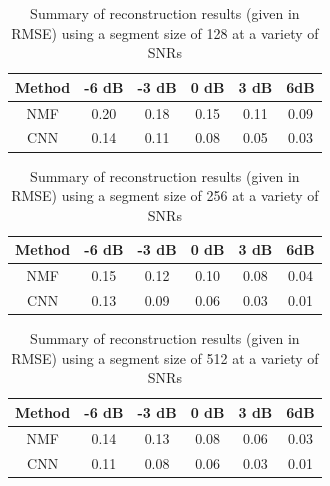 \documentclass[12pt,chapterheads]{ucsd}
\begin{document}
\vspace{0.25in}
\begin{table}[!ht]
\caption{Summary of reconstruction results (given in RMSE) using a segment size of 128 at a variety of SNRs}

\vspace{-0.25in}
\begin{center}
\begin{tabular}{| c | c | c |  c | c | c |}

\hline
Method & -6 dB & -3 dB & 0 dB & 3 dB & 6dB \\

\hline
NMF & 0.20 & 0.18 & 0.15 & 0.11 & 0.09 \\

\hline
CNN & 0.14 & 0.11 & 0.08 & 0.05 & 0.03 \\

\hline
\end{tabular}
\end{center}
\label{table:results_seg_128}
\end{table}

\vspace{0.25in}
\begin{table}[!ht]
\caption{Summary of reconstruction results (given in RMSE) using a segment size of 256 at a variety of SNRs}

\vspace{-0.25in}
\begin{center}
\begin{tabular}{| c | c | c |  c | c | c |}

\hline
Method & -6 dB & -3 dB & 0 dB & 3 dB & 6dB \\

\hline
NMF & 0.15 & 0.12 & 0.10 & 0.08 & 0.04 \\

\hline
CNN & 0.13 & 0.09 & 0.06 & 0.03 & 0.01 \\

\hline
\end{tabular}
\end{center}
\label{table:results_seg_256}
\end{table}

\vspace{0.25in}
\begin{table}[!ht]
\caption{Summary of reconstruction results (given in RMSE) using a segment size of 512 at a variety of SNRs}

\vspace{-0.25in}
\begin{center}
\begin{tabular}{| c | c | c |  c | c | c |}

\hline
Method & -6 dB & -3 dB & 0 dB & 3 dB & 6dB \\

\hline
NMF & 0.14 & 0.13 & 0.08 & 0.06 & 0.03 \\

\hline
CNN & 0.11 & 0.08 & 0.06 & 0.03 & 0.01 \\

\hline
\end{tabular}
\end{center}
\label{table:results_seg_512}
\end{table}
\end{document}
